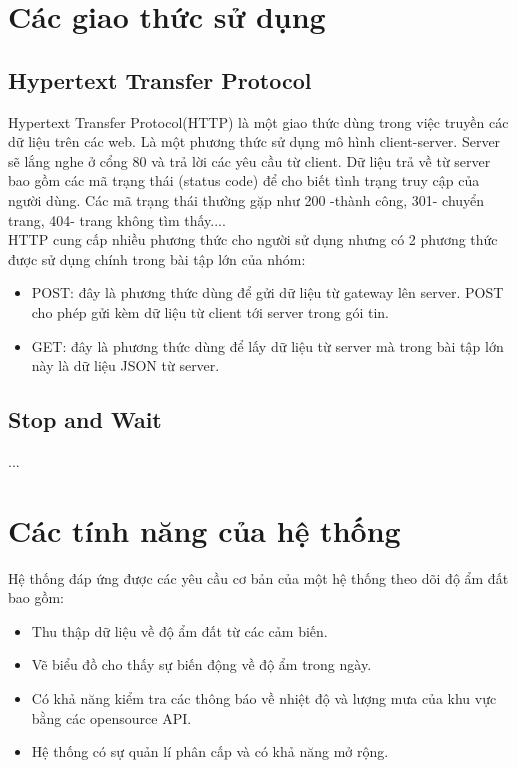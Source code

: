\documentclass[a4paper]{article}
\begin{document}
\section{Các giao thức sử dụng}
	\subsection{Hypertext Transfer Protocol}
    Hypertext Transfer Protocol(HTTP)\cite{HTTP} là một giao thức dùng trong việc truyền các dữ liệu trên các web. Là một phương thức sử dụng mô hình client-server. Server sẽ lắng nghe ở cổng 80 và trả lời các yêu cầu từ client. Dữ liệu trả về từ server bao gồm các mã trạng thái (status code) để  cho biết tình trạng truy cập của người dùng. Các mã trạng thái thường gặp như 200 -thành công, 301- chuyển trang, 404- trang không tìm thấy....\\
    
    HTTP cung cấp nhiều phương thức cho người sử dụng nhưng có 2 phương thức được sử dụng chính trong bài tập lớn của nhóm:
    \begin{itemize}
        \item POST: đây là phương thức dùng để  gửi dữ liệu từ gateway lên server. POST cho phép gửi kèm dữ liệu từ client tới server trong gói tin.
        \item GET: đây là phương thức dùng để lấy dữ liệu từ server mà trong bài tập lớn này là dữ liệu JSON từ server.
    \end{itemize}
	
	
	\subsection{Stop and Wait}
	...
\section{Các tính năng của hệ thống}
Hệ thống đáp ứng được các yêu cầu cơ bản của một hệ thống theo dõi độ ẩm đất bao gồm:
\begin{itemize}
    \item Thu thập dữ liệu về độ ẩm đất từ các cảm biến.
    \item Vẽ biểu đồ cho thấy sự biến động về độ ẩm trong ngày.
    \item Có khả năng kiểm tra các thông báo về nhiệt độ và lượng mưa của khu vực bằng các opensource API\cite{weatherAPI}.
    \item Hệ thống có sự quản lí phân cấp và có khả năng mở rộng.
\end{itemize}
\end{document}
